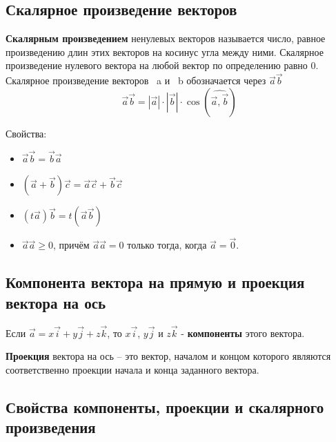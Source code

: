 \documentclass[a4paper]{article}
\begin{document}
    \newpage \begin{center}
                 \begin{Large}
                 \end{Large}
    \end{center}
    \subsection*{Скалярное произведение векторов}

    \textbf{Скалярным произведением} ненулевых векторов называется число, равное
    произведению длин этих векторов на косинус угла между ними. Скалярное
    произведение нулевого вектора на любой вектор по определению равно 0.
    Скалярное произведение векторов ~a и ~b обозначается через $\vec{a} \vec{b}$
    \begin{equation}
        \vec{a} \vec{b} = |\vec{a}| \cdot | \vec{b} | \cdot \cos(\widehat{\vec{a}, \vec{b}})
    \end{equation}

    Свойства:
    \begin{itemize}
        \item $\vec{a} \vec{b} = \vec{b} \vec{a}$
        \item $(\vec{a} + \vec{b}) \vec{c} = \vec{a} \vec{c} + \vec{b} \vec{c}$
        \item $(t \vec{a}) \vec{b} = t (\vec{a} \vec{b})$
        \item $\vec{a} \vec{a} \geq 0$, причём $\vec{a} \vec{a} = 0$ только тогда, когда $\vec{a} = \vec{0}$.
    \end{itemize}

    \subsection*{Компонента вектора на прямую и проекция вектора на ось
    }
    Если $\vec{a} = x \vec{i} + y \vec{j} + z \vec{k}$, то $x \vec{i}$, $y \vec{j}$ и $z \vec{k}$ - \textbf{компоненты} этого вектора.

    \textbf{Проекция} вектора на ось – это вектор, началом и концом которого являются соответственно проекции начала и конца заданного вектора.

    \subsection*{Свойства компоненты, проекции и скалярного произведения}
\end{document}
